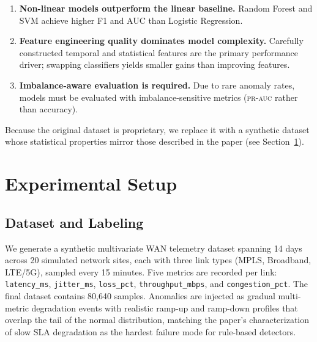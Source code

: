 \documentclass{article}
\newcommand{\prauc}{\textsc{pr-auc}\xspace}
\begin{document}
\begin{enumerate}
  \item \textbf{Non-linear models outperform the linear baseline.}
        Random Forest and SVM achieve higher F1 and AUC than Logistic Regression.
  \item \textbf{Feature engineering quality dominates model complexity.}
        Carefully constructed temporal and statistical features are the primary
        performance driver; swapping classifiers yields smaller gains than
        improving features.
  \item \textbf{Imbalance-aware evaluation is required.}
        Due to rare anomaly rates, models must be evaluated with
        imbalance-sensitive metrics (\prauc rather than accuracy).
\end{enumerate}

Because the original dataset is proprietary, we replace it with a synthetic
dataset whose statistical properties mirror those described in the paper
(see Section~\ref{sec:setup}).

\section{Experimental Setup}
\label{sec:setup}

\subsection{Dataset and Labeling}

We generate a synthetic multivariate WAN telemetry dataset spanning 14 days
across 20 simulated network sites, each with three link types (MPLS, Broadband,
LTE/5G), sampled every 15 minutes.
Five metrics are recorded per link: \texttt{latency\_ms}, \texttt{jitter\_ms},
\texttt{loss\_pct}, \texttt{throughput\_mbps}, and \texttt{congestion\_pct}.
The final dataset contains 80{,}640 samples.
Anomalies are injected as gradual multi-metric degradation events with realistic
ramp-up and ramp-down profiles that overlap the tail of the normal distribution,
matching the paper's characterization of slow SLA degradation as the hardest
failure mode for rule-based detectors.
\end{document}

